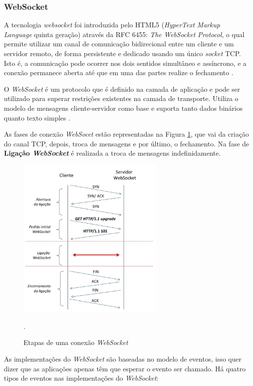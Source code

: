 \documentclass[
	12pt,				%
	oneside,			%
	a4paper,			%
	english,			%
	brazil				%
	]{abntex2ppgsi}
\begin{document}
\subsubsection{WebSocket}

A tecnologia \textit{websocket} foi introduzida pelo HTML5 (\textit{HyperText Markup Language} quinta geração) através da RFC 6455: \textit{The WebSocket Protocol}, o qual permite utilizar um canal de comunicação bidirecional entre um cliente e um servidor remoto, de forma persistente e dedicado usando um único \textit{socket} TCP. Isto é, a comunicação pode ocorrer nos dois sentidos simultâneo e assíncrono, e a conexão permanece aberta até que em uma das partes realize o fechamento \cite{melnikov2011websocket}.

O \textit{WebSocket} é um protocolo que é definido na camada de aplicação e pode ser utilizado para superar restrições existentes na camada de transporte. Utiliza o modelo de mensagens cliente-servidor como base e suporta tanto dados binários quanto texto simples \cite{themudo2014implementaccao}.

As fases de conexão \textit{WebSocet} estão representadas na Figura \ref{fig:etapas_ws}, que vai da criação do canal TCP, depois, troca de mensagens e por último, o fechamento. Na fase de \textbf{Ligação \textit{WebSocket}} é realizada a troca de mensagens indefinidamente.

\begin{figure}[h!]
	\centering
	\includegraphics[height=8cm]{images/etapas_ws.png}
	\caption{Etapas de uma conexão \textit{WebSocket} \cite{themudo2014implementaccao}}.
	\label{fig:etapas_ws}
\end{figure}

As implementações do \textit{WebSocket} são baseadas no modelo de eventos, isso quer dizer que as aplicações apenas têm que esperar o evento ser chamado. Há quatro tipos de eventos nas implementações do \textit{WebSocket}:
 
\end{document}
